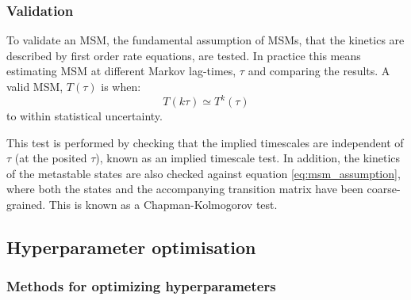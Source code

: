 \documentclass[journal=jacsat,manuscript=article]{achemso}
\begin{document}
\subsubsection{Validation}

To validate an MSM,  the fundamental assumption of MSMs, that the kinetics are described by first order rate equations, are tested.  In practice this means estimating MSM at different Markov lag-times, $\tau$  and comparing the results.  A valid MSM, $T(\tau)$ is when: 
\begin{equation}
    T(k\tau) \simeq T^{k}(\tau)
\end{equation}\label{eq:msm_assumption}
to within statistical uncertainty.

This test is performed by checking that the implied timescales are independent of $\tau$ (at the posited $\tau$), known as an implied timescale test. In addition, the kinetics of the metastable states are also checked against equation \ref{eq:msm_assumption}, where both the states and the accompanying transition matrix have been coarse-grained. This is known as a Chapman-Kolmogorov test.    

\subsection{Hyperparameter optimisation}

\subsubsection{Methods for optimizing hyperparameters}
\end{document}
